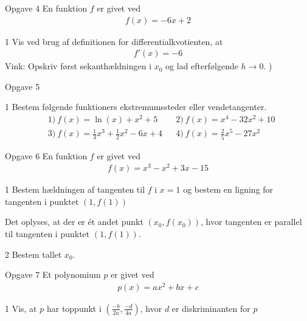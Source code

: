 \newpage
%
%
%
%
%
\begin{opgavetekst}{Opgave 4}
	En funktion $f$ er givet ved
	\begin{align*}
		f(x) = -6x + 2
	\end{align*}
\end{opgavetekst}
\begin{delopgave}{1}
	Vis ved brug af definitionen for differentialkvotienten, at 
	\begin{align*}
		f'(x) = -6 
	\end{align*}
	Vink: Opskriv først sekanthældningen i $x_0$ og lad efterfølgende $h \to 0$. )
\end{delopgave}
%
%
%
%
%
\begin{opgavetekst}{Opgave 5}
\end{opgavetekst}
\begin{delopgave}{1}
	Bestem følgende funktioners ekstremumssteder eller vendetangenter.
	\begin{align*}
		&1) \ f(x) = \ln(x) + x^2 + 5  &   &2) \ f(x) = x^4 - 32x^2 + 10 \\
		&3) \ f(x) = \frac{1}{3}x^3 + \frac{1}{2}x^2 - 6x + 4  &   &4) \ f(x) = \frac{2}{5}x^5-27x^2
	\end{align*}
\end{delopgave}
%
%
%
%
%
\begin{opgavetekst}{Opgave 6}
	En funktion $f$ er givet ved
	\begin{align*}
		f(x) = x^3 - x^2 + 3x - 15
	\end{align*}
\end{opgavetekst}
\begin{delopgave}{1}
	Bestem hældningen af tangenten til $f$ i $x = 1$ og bestem en ligning for tangenten i punktet $(1,f(1))$
\end{delopgave}
\begin{meretekst}
	Det oplyses, at der er ét andet punkt $(x_0,f(x_0))$, hvor tangenten er parallel til tangenten i punktet $(1,f(1))$.
\end{meretekst}
\begin{delopgave}{2}
	Bestem tallet $x_0$.
\end{delopgave}
%
%
%
%
%
\begin{opgavetekst}{Opgave 7}
	Et polynomium $p$ er givet ved
	\begin{align*}
		p(x) = ax^2 + bx + c
	\end{align*}
\end{opgavetekst}
\begin{delopgave}{1}
	Vis, at $p$ har toppunkt i $\left(\frac{-b}{2a}, \frac{-d}{4a}\right)$, hvor $d$ er diskriminanten for $p$
\end{delopgave}